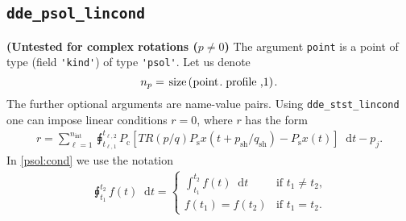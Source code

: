 \documentclass[11pt]{scrartcl}
\newcommand{\mt}[1]{\mathrm{#1}}
\renewcommand{\d}{\mathop{}\!\mathrm{d}}
\newcommand{\nint}{{n_\mt{int}}}
\newcommand{\Pc}{P_\mt{c}}
\newcommand{\Ps}{P_\mt{s}}
\newcommand{\psh}{p_\mt{sh}}
\newcommand{\qsh}{q_\mt{sh}}
\newcommand{\dint}{\sqint}
\newcommand{\blist}[1]{\mbox{\lstinline!#1!}}  \newlength{\tabw}
\begin{document}
\subsection{\blist{dde_psol_lincond}}
\label{psol}
\textbf{\color{red}(Untested for complex rotations ($p\neq0$)} The argument
\blist{point} is a point of type (field \blist{'kind'}) of type
\blist{'psol'}. Let us denote
\begin{displaymath}
  n_p=\blist{size(point.profile,1)}.
\end{displaymath}
The further optional arguments are name-value pairs. Using
\blist{dde_stst_lincond} one can impose linear conditions $r=0$, where
$r$ has the form
\begin{align}
  \label{psol:cond}
  r=\sum_{\ell=1}^\nint \dint_{t_{\ell,1}}^{t_{\ell,2}}\Pc\left[TR(p/q)\Ps x(t+\psh/\qsh)-\Ps x(t)\right]\d t-p_j.
\end{align}
In \eqref{psol:cond} we use the notation
\begin{align*}
  \dint_{t_1}^{t_2}f(t)\d t=
  \begin{cases}
  \int_{t_1}^{t_2}f(t)\d t&\mbox{if $t_1\neq t_2$,}\\
  f(t_1)=f(t_2)&\mbox{if $t_1=t_2$.}
  \end{cases}
\end{align*}
\end{document}
